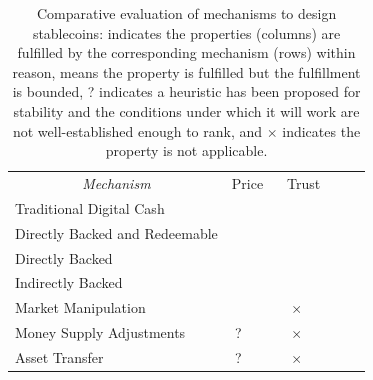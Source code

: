 \begin{table}[t!]
\centering

	\begin{tabular}{ lllllllll}

&
\headrow{Corrects undervaluation} &
\headrow{Corrects overvaluation} &
\headrow{Decentralized issuance } &
\headrow{Decentralized redemption} &
\headrow{Decentralized transfer} &
\headrow{No trusted oracle} \\
\hline

	 \multicolumn{1}{c}{\textit{Mechanism} } &    \multicolumn{2}{|c|}{Price} &  \multicolumn{4}{c}{Trust}  \\

	\hline

	Traditional Digital Cash			& \multicolumn{1}{|c|}{\full} & \multicolumn{1}{c|}{\full}   & \multicolumn{1}{c|}{} & \multicolumn{1}{c|}{} & \multicolumn{1}{c|}{} & \multicolumn{1}{c}{\full}   \\

	\hline

	Directly Backed and Redeemable	& \multicolumn{1}{|c|}{\full} 	& \multicolumn{1}{c|}{\full}   & \multicolumn{1}{c|}{} 		& \multicolumn{1}{c|}{} 		& \multicolumn{1}{c|}{\full} & \multicolumn{1}{c}{\full}    \\
	Directly Backed                              	& \multicolumn{1}{|c|}{} 		& \multicolumn{1}{c|}{\full}   & \multicolumn{1}{c|}{ } 	& \multicolumn{1}{c|}{} 		& \multicolumn{1}{c|}{\full} & \multicolumn{1}{c}{\full}    \\
	Indirectly Backed 				& \multicolumn{1}{|c|}{\prt} 	& \multicolumn{1}{c|}{\full}   & \multicolumn{1}{c|}{\full} 	& \multicolumn{1}{c|}{\full} 	& \multicolumn{1}{c|}{\full} & \multicolumn{1}{c}{}    \\      \hline
	Market Manipulation                       	& \multicolumn{1}{|c|}{\prt} 		& \multicolumn{1}{c|}{\prt}   & \multicolumn{1}{c|}{\full} 	& \multicolumn{1}{c|}{$\times$} 		& \multicolumn{1}{c|}{\full} & \multicolumn{1}{c}{}    \\
	Money Supply Adjustments             	& \multicolumn{1}{|c|}{?} 		& \multicolumn{1}{c|}{\full}   & \multicolumn{1}{c|}{\full} 	& \multicolumn{1}{c|}{$\times$} 		& \multicolumn{1}{c|}{\full} & \multicolumn{1}{c}{}    \\
	Asset Transfer	                                & \multicolumn{1}{|c|}{?} 		& \multicolumn{1}{c|}{\full}   & \multicolumn{1}{c|}{\full} 	& \multicolumn{1}{c|}{$\times$} 		& \multicolumn{1}{c|}{\full} & \multicolumn{1}{c}{}    \\
	\hline

	\end{tabular}
	\caption{Comparative evaluation of mechanisms to design stablecoins: {\full} indicates the properties (columns) are fulfilled by the corresponding mechanism (rows) within reason, {\prt} means the property is fulfilled but the fulfillment is bounded, {?} indicates a heuristic has been proposed for stability and the conditions under which it will work are not well-established enough to rank, and $\times$ indicates the property is not applicable.
	\label{tab:evframework}}
\end{table}


